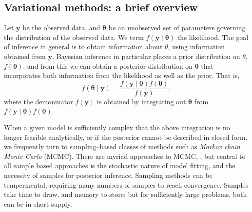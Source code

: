 
\subsection{Variational methods: a brief overview}
Let $\bm{y}$ be the observed data, and $\bm{\theta}$ be an unobserved set of 
    parameters governing the distribution of the observed data.  We term 
    $f(\bm{y}\mid\bm{\theta})$ the likelihood.  The goal of inference in 
    general is to obtain information about $\theta$, using information 
    obtained from $\bm{y}$. Bayesian inference in particular places a prior
    distribution on $\theta$, $f(\bm{\theta})$, and from this we can obtain a
    posterior distribution on $\bm{\theta}$ that incorporates both information
    from the likelihood as well as the prior.  That is,
    \[
        f(\bm{\theta}\mid\bm{y}) = 
            \frac{f(\bm{y}\mid\bm{\theta})f(\bm{\theta})}{f(\bm{y})},
    \]
    where the demoninator $f(\bm{y})$ is obtained by integrating out 
    $\bm{\theta}$ from $f(\bm{y}\mid\bm{\theta})f(\bm{\theta})$.

When a given model is sufficiently complex that the above integration is no
    longer feasible analytically, or if the posterior cannot be described in
    closed form, we frequently 
    turn to sampling--based classes of methods such as 
    \emph{Markov chain Monte Carlo} (MCMC)\needcite. There are myriad approaches 
    to MCMC, , but central to all sample
    based approaches is the stochastic nature of model fitting, and the 
    necessity of samples for posterior inference.  Sampling methods can be 
    tempermental, requiring many numbers of samples to reach convergence.
    Samples take time to draw, and memory to store; but for sufficiently large 
    problems, both can be in short supply.

